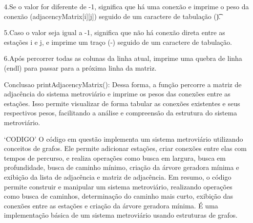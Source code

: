 4.Se o valor for diferente de -1, significa que há uma conexão e imprime o peso da conexão (adjacencyMatrix[i][j]) seguido de um caractere de tabulação (\t).

5.Caso o valor seja igual a -1, significa que não há conexão direta entre as estações i e j, e imprime um traço (-) seguido de um caractere de tabulação.

6.Após percorrer todas as colunas da linha atual, imprime uma quebra de linha (endl) para passar para a próxima linha da matriz.

Conclusao printAdjacencyMatrix():
Dessa forma, a função percorre a matriz de adjacência do sistema metroviário 
e imprime os pesos das conexões entre as estações. 
Isso permite visualizar de forma tabular as conexões existentes e seus respectivos pesos, 
facilitando a análise e compreensão da estrutura do sistema metroviário.

`CODIGO'
O código em questão implementa um sistema metroviário utilizando conceitos de grafos. 
Ele permite adicionar estações, criar conexões entre elas com tempos de percurso, e realiza operações como busca em largura, busca em profundidade, busca de caminho mínimo, criação da árvore geradora mínima e exibição da lista de adjacência e matriz de adjacência.
Em resumo, o código permite construir e manipular um sistema metroviário, realizando operações como busca de caminhos, determinação do caminho mais curto, exibição das conexões entre as estações e criação da árvore geradora mínima. É uma implementação básica de um sistema metroviário usando estruturas de grafos.